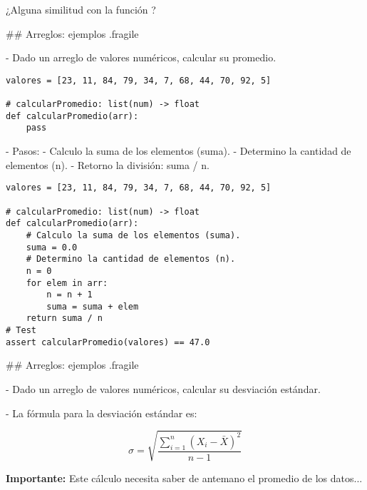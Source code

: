 
\bgnblocknormal
¿Alguna similitud con la función ?
\trmblocknormal

\trmcolumns

## Arreglos: ejemplos {.fragile}


- Dado un arreglo de valores numéricos, calcular su promedio.

\begin{lstlisting}[style=frame03]
valores = [23, 11, 84, 79, 34, 7, 68, 44, 70, 92, 5]

# calcularPromedio: list(num) -> float
def calcularPromedio(arr):
    pass
\end{lstlisting}

- Pasos:
    - Calculo la suma de los elementos (suma).
    - Determino la cantidad de elementos (n).
    - Retorno la división: suma / n.


\begin{lstlisting}[style=frame03]
valores = [23, 11, 84, 79, 34, 7, 68, 44, 70, 92, 5]

# calcularPromedio: list(num) -> float
def calcularPromedio(arr):
    # Calculo la suma de los elementos (suma).
    suma = 0.0
    # Determino la cantidad de elementos (n).
    n = 0
    for elem in arr:
        n = n + 1
        suma = suma + elem
    return suma / n
# Test
assert calcularPromedio(valores) == 47.0
\end{lstlisting}

## Arreglos: ejemplos {.fragile}


- Dado un arreglo de valores numéricos, calcular su desviación estándar.

\pause

- La fórmula para la desviación estándar es:

\bgnblocknormal[centered,wd=.7\textwidth]
\vspace{-3ex}
$$ \sigma = \sqrt{\frac{\sum^n_{i=1}{(X_i - \bar{X})}^2}{n-1}} $$
\vspace{-2ex}
\trmblocknormal

\pause
\vspace{5mm}
\textbf{Importante:} Este cálculo necesita saber de antemano el promedio de los datos...

